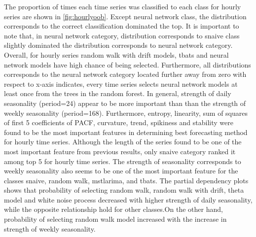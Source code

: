 \documentclass[11pt,a4paper,]{article}
\theoremstyle{definition}
\theoremstyle{definition}
\theoremstyle{definition}
\theoremstyle{remark}
\begin{document}
The proportion of times each time series was classified to each class
for hourly series are shown in \autoref{fig:hourlyoob}. Except neural
network class, the distribution corresponds to the correct
classification dominated the top. It is important to note that, in
neural network category, distribution corresponds to snaive class
slightly dominated the distribution corresponds to neural network
category. Overall, for hourly series random walk with drift models,
tbats and neural network models have high chance of being selected.
Furthermore, all distributions corresponds to the neural network
category located further away from zero with respect to x-axis
indicates, every time series selects neural network models at least once
from the trees in the random forest. In general, strength of daily
seasonality (period=24) appear to be more important than than the
strength of weekly seasonality (period=168). Furthermore, entropy,
linearity, sum of squares of first 5 coefficients of PACF, curvature,
trend, spikiness and stability were found to be the most important
features in determining best forecasting method for hourly time series.
Although the length of the series found to be one of the most important
feature from previous results, only snaive category ranked it among top
5 for hourly time series. The strength of seasonality corresponds to
weekly seasonality also seems to be one of the most important feature
for the classes snaive, random walk, mstlarima, and tbats. The partial
dependency plots shows that probability of selecting random walk, random
walk with drift, theta model and white noise process decreased with
higher strength of daily seasonality, while the opposite relationship
hold for other classes.On the other hand, probability of selecting
random walk model increased with the increase in strength of weekly
seasonality.
\end{document}
